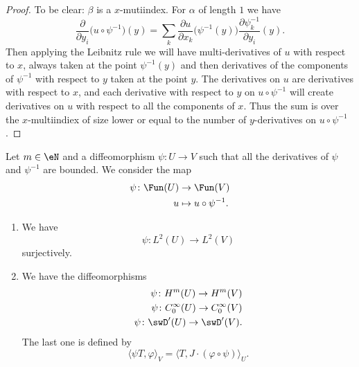 \begin{proof}
	To be clear: \( \beta\) is a \( x\)-mutiindex. For \( \alpha\) of length \( 1\) we have
	\begin{equation}
		\frac{ \partial  }{ \partial y_i }\big( u\circ\psi^{-1} \big)(y)=\sum_k\frac{ \partial u }{ \partial x_k }\big( \psi^{-1}(y) \big)\frac{ \partial \psi_k^{-1} }{ \partial y_i }(y).
	\end{equation}
	Then applying the Leibnitz rule we will have multi-derivatives of \( u\) with respect to \( x\), always taken at the point \( \psi^{-1}(y)\) and then derivatives of the components of \( \psi^{-1}\) with respect to \( y\) taken at the point \( y\). The derivatives on \( u\) are derivatives with respect to \( x\), and each derivative with respect to \( y\) on \( u\circ\psi^{-1}\) will create derivatives on $u$ with respect to all the components of \( x\). Thus the sum is over the \( x\)-multiindiex of size lower or equal to the number of \( y\)-derivatives on \( u\circ\psi^{-1}\).
\end{proof}

\begin{proposition}
	Let \( m\in \eN\) and a diffeomorphism \( \psi\colon U\to V\) such that all the derivatives of \( \psi\) and \( \psi^{-1}\) are bounded. We consider the map
	\begin{equation}
		\begin{aligned}
			\psi\colon \Fun(U) & \to \Fun(V)              \\
			u                  & \mapsto u\circ\psi^{-1}.
		\end{aligned}
	\end{equation}
	\begin{enumerate}
		\item       \label{ITEMooNJZOooOrzQIT}
		      We have
		      \begin{equation}
			      \psi\colon L^2(U)\to L^2(V)
		      \end{equation}
		      surjectively.
		\item
		      We have the diffeomorphisms
		      \begin{subequations}
			      \begin{align}
				      \psi\colon H^m(U)\to H^m(V)                     \\
				      \psi\colon  C^{\infty}_0(U)\to  C^{\infty}_0(V) \\
				      \psi\colon \swD'(U)\to \swD'(V).
			      \end{align}
		      \end{subequations}
		      The last one is defined by
		      \begin{equation}
			      \langle \psi T, \varphi\rangle_V=\langle T, J\cdot(\varphi\circ\psi)\rangle_U.
		      \end{equation}
	\end{enumerate}
\end{proposition}

